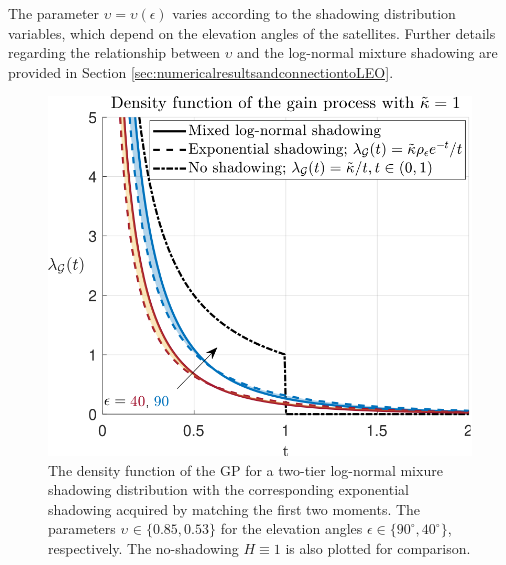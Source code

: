 \documentclass[lettersize,journal]{IEEEtran}
\begin{document}
The parameter $\upsilon = \upsilon(\epsilon)$ varies according to the shadowing distribution variables, which depend on the elevation angles of the satellites. Further details regarding the relationship between $\upsilon$ and the log-normal mixture shadowing are provided in Section \ref{sec:numericalresultsandconnectiontoLEO}.

         \begin{figure}[h]
           \centering
           \includegraphics[width=\linewidth]{plotdensities.pdf}
           \caption{The density function of the GP for a two-tier log-normal mixure shadowing distribution with the corresponding exponential shadowing acquired by matching the first two moments. The parameters $\upsilon_{} \in \{0.85,0.53\}$ for the elevation angles $\epsilon \in \{90^{\circ},40^{\circ}\}$, respectively. The no-shadowing $H\equiv 1$ is also plotted for comparison.} 
           \label{fig:plotdensities}
         \end{figure}

\end{document}
